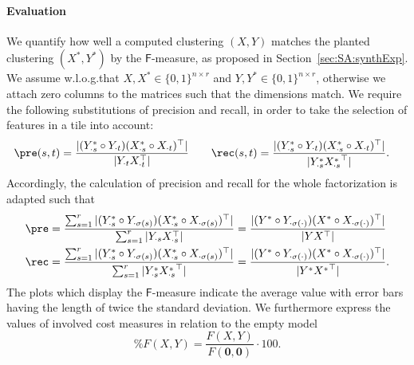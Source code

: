 \paragraph{Evaluation}
We quantify how well a computed clustering $(X,Y)$  matches the planted clustering $(X^*,Y^*)$ by the $\mathsf{F}$-measure, as proposed in Section~\ref{sec:SA:synthExp}.
We assume w.l.o.g.\@ that $X,X^*\in\{0,1\}^{n\times r}$ and $Y,Y^*\in\{0,1\}^{n\times r}$, otherwise we attach zero columns to the matrices such that the dimensions match. We require the following substitutions of precision and recall, in order to take the selection of features in a tile into account:
\begin{align*}
	\pre(s,t) &= \frac{|(Y^*_{\cdot s}\circ Y_{\cdot t})(X^*_{\cdot s}\circ X_{\cdot t})^\top |}{|Y_{\cdot t}X_{\cdot t}^\top |} &\quad 
    \rec(s,t) &= \frac{|(Y^*_{\cdot s}\circ Y_{\cdot t})(X^*_{\cdot s}\circ X_{\cdot t})^\top |}{|Y^*_{\cdot s}{X^*_{\cdot s}}^\top |}. 
\end{align*}
Accordingly, the calculation of precision and recall for the whole factorization is adapted such that
\begin{align*}
\pre &= \frac{\sum_{s=1}^r|(Y^*_{\cdot s}\circ Y_{\cdot \sigma(s)})(X^*_{\cdot s}\circ X_{\cdot \sigma(s)})^\top |}{\sum_{s=1}^r|Y_{\cdot s}X_{\cdot s}^\top |} 
= \frac{|(Y^*\circ Y_{\cdot \sigma(\cdot)})(X^*\circ X_{\cdot \sigma(\cdot)})^\top |}{|YX^\top |}\\ 
\rec &= \frac{\sum_{s=1}^r|(Y^*_{\cdot s}\circ Y_{\cdot \sigma(s)})(X^*_{\cdot s}\circ X_{\cdot \sigma(s)})^\top |}{\sum_{s=1}^r|Y_{\cdot s}^* {X_{\cdot s}^*}^\top |} 
    = \frac{|(Y^*\circ Y_{\cdot\sigma(\cdot)})(X^*\circ X_{\cdot \sigma(\cdot)})^\top |}{|Y^*{X^*}^\top |}.
\end{align*}
The plots which display the $\mathsf{F}$-measure indicate the average value with error bars having the length of twice the standard deviation.
We furthermore express the values of involved cost measures in relation to the empty model
\[
	\%F(X,Y) = \frac{F(X,Y)}{F(\mathbf{0},\mathbf{0})}\cdot 100.
\]

